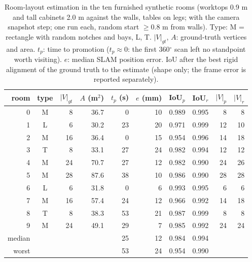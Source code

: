 \begin{table}[t]
\centering
\caption{Room-layout estimation in the ten furnished synthetic rooms (worktops 0.9 m and tall cabinets 2.0 m against the walls, tables on legs; with the camera snapshot step; one run each, random start $\geq$0.8 m from walls). Type: M = rectangle with random notches and bays, L, T. $|V|_{gt}$, $A$: ground-truth vertices and area. $t_p$: time to promotion ($t_p\approx0$: the first 360$^\circ$ scan left no standpoint worth visiting). $e$: median SLAM position error. IoU after the best rigid alignment of the ground truth to the estimate (shape only; the frame error is reported separately).}
\label{tab:estimation-synthetic-furnished-v5}
\begin{tabular}{r c r r r r r r r r}
\toprule
room & type & $|V|_{gt}$ & $A$ (m$^2$) & $t_p$ (s) & $e$ (mm) & IoU$_p$ & IoU$_r$ & $|V|_p$ & $|V|_r$ \\
\midrule
0 & M & 8 & 36.7 & 0 & 10 & 0.989 & 0.995 & 8 & 8 \\
1 & L & 6 & 30.2 & 23 & 20 & 0.971 & 0.999 & 12 & 10 \\
2 & M & 16 & 36.4 & 0 & 15 & 0.954 & 0.996 & 14 & 18 \\
3 & T & 8 & 33.1 & 27 & 24 & 0.982 & 0.994 & 12 & 12 \\
4 & M & 24 & 70.7 & 27 & 12 & 0.982 & 0.990 & 24 & 26 \\
5 & M & 28 & 87.6 & 38 & 10 & 0.986 & 0.990 & 28 & 28 \\
6 & L & 6 & 31.8 & 0 & 6 & 0.993 & 0.995 & 6 & 6 \\
7 & M & 16 & 57.4 & 24 & 12 & 0.966 & 0.992 & 14 & 18 \\
8 & T & 8 & 38.3 & 53 & 21 & 0.987 & 0.999 & 8 & 8 \\
9 & M & 24 & 49.1 & 29 & 7 & 0.985 & 0.992 & 24 & 24 \\
\midrule
median & & & & 25 & 12 & 0.984 & 0.994 & & \\
worst & & & & 53 & 24 & 0.954 & 0.990 & & \\
\bottomrule
\end{tabular}
\end{table}
